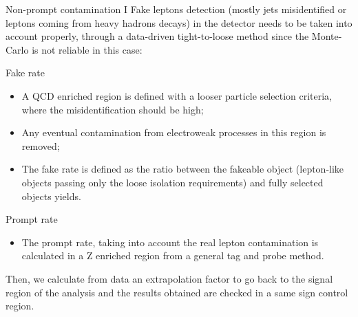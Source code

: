 \documentclass[8pt]{beamer}
\begin{document}
\begin{frame}{Non-prompt contamination I}
\justifying
Fake leptons detection (mostly jets misidentified or leptons coming from heavy hadrons decays) in the detector needs to be taken into account properly, through a \alert{data-driven tight-to-loose method} since the Monte-Carlo is not reliable in this case: \vfill

\begin{block}{\centering Fake rate}\end{block} \vspace{-5pt}
\begin{itemize}
\justifying
\item A QCD enriched region is defined with a looser particle selection criteria, where the misidentification should be high;
\item Any eventual contamination from electroweak processes in this region is removed;
\item The \alert{fake rate} is defined as the ratio between the fakeable object (lepton-like objects passing only the loose isolation requirements) and fully selected objects yields.
\end{itemize} \vfill

\begin{block}{\centering Prompt rate}\end{block} \vspace{-5pt}
\begin{itemize}
\justifying
\item The \alert{prompt rate}, taking into account the real lepton contamination is calculated in a Z enriched region from a general tag and probe method.
\end{itemize} \vfill

Then, we calculate from data an extrapolation factor to go back to the signal region of the analysis and the results obtained are checked in a \alert{same sign control region}. \vfill
\end{frame}
\end{document}
